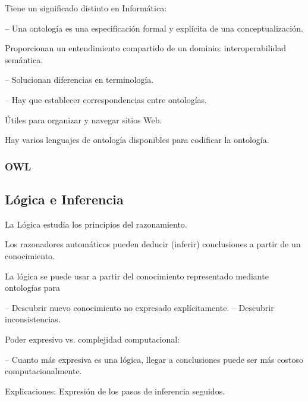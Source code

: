 Tiene un significado distinto en Informática:

– Una ontología es una especificación formal y explícita de una conceptualización.

Proporcionan un entendimiento compartido de un dominio: interoperabilidad semántica.

– Solucionan diferencias en terminología.

– Hay que establecer correspondencias entre ontologías.

Útiles para organizar y navegar sitios Web.







Hay varios lenguajes de ontología disponibles para codificar la ontología.

\subsubsection{OWL}


\subsection{Lógica e Inferencia}

La Lógica estudia los principios del razonamiento.

Los razonadores automáticos pueden deducir (inferir) conclusiones a partir de un conocimiento.

La lógica se puede usar a partir del conocimiento representado mediante ontologías para

– Descubrir nuevo conocimiento no expresado explícitamente. 
– Descubrir inconsistencias.

Poder expresivo vs. complejidad computacional:

– Cuanto más expresiva es una lógica, llegar a conclusiones puede ser más costoso computacionalmente.

Explicaciones: Expresión de los pasos de inferencia seguidos.


